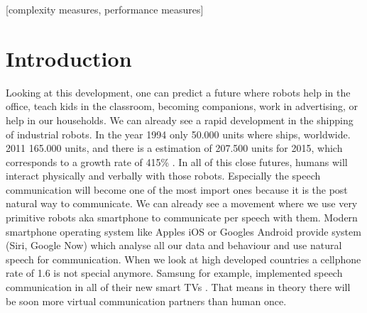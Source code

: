 \documentclass{acm_proc_article-sp}
\begin{document}
[complexity measures, performance measures]



\section{Introduction}
Looking at this development, one can predict a future where robots help in the office, teach kids in the classroom, becoming companions, work in advertising, or help in our households. We can already see a rapid development in the shipping of industrial robots. In the year 1994 only 50.000 units where ships, worldwide. 2011 165.000 units, and there is a estimation of 207.500 units for 2015, which corresponds to a growth rate of 415\% \cite{Worldrobotcs.org2012}. In all of this close futures, humans will interact physically and verbally with those robots. Especially the speech communication will become one of the most import ones because it is the post natural way to communicate. We can already see a movement where we use very primitive robots aka smartphone to communicate per speech with them. Modern smartphone operating system like Apples iOS or Googles Android provide system (Siri, Google Now) which analyse all our data and behaviour and use natural speech for communication. When we look at high developed countries a cellphone rate of 1.6 is not special anymore\cite{NSA2011}. Samsung for example, implemented speech communication in all of their new smart TVs \cite{Samsung}. That means in theory there will be soon more virtual communication partners than human once. 
\end{document}

